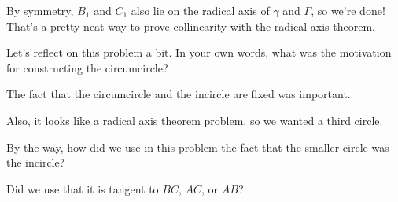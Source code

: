 By symmetry, $B_1$ and $C_1$ also lie on the radical axis of $\gamma$ and $\Gamma$, so we're done! That's a pretty neat way to prove collinearity with the radical axis theorem. 

Let's reflect on this problem a bit. In your own words, what was the motivation for constructing the circumcircle?






The fact that the circumcircle and the incircle are fixed was important.

Also, it looks like a radical axis theorem problem, so we wanted a third circle.

By the way, how did we use in this problem the fact that the smaller circle was the incircle?


Did we use that it is tangent to $BC$, $AC$, or $AB$?






